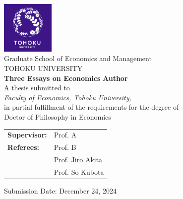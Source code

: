\documentclass[oneside, 12pt, a4paper]{book}
\author{author}
\theoremstyle{definition}\newtheorem{definition}{Definition}
\theoremstyle{theorem}\newtheorem{corollary}{Corollary}
\theoremstyle{definition}\newtheorem{ass}{Assumption}
\theoremstyle{definition}\newtheorem{remark}{Remark}
\theoremstyle{theorem}\newtheorem{prop}{Proposition}
\theoremstyle{theorem}\newtheorem{lemma}{Lemma}
\theoremstyle{definition}\newtheorem{fact}{Fact}
\numberwithin{corollary}{chapter}
\numberwithin{prop}{chapter}
\numberwithin{ass}{chapter}
\numberwithin{definition}{chapter}
\numberwithin{lemma}{chapter}
\numberwithin{equation}{chapter}
\begin{document}

\begin{titlepage}
    \begin{center}
        \includegraphics[width=0.19\textwidth]{logo.png}\\[5pt]
        {Graduate School of Economics and Management}\\[5pt]
        {TOHOKU UNIVERSITY}\\[5pt]
        
        \vspace{1.5cm}
        {\huge\bfseries Three Essays on Economics}
        \vspace{1.5cm}
        {\Large\bfseries Author}\\[5pt]
        
        \vspace{2cm}
        {A thesis  submitted to} \\[5pt]
        \emph{{Faculty of Economics, Tohoku University,}}\\[5pt]
        {in partial fulfillment of the requirements for the degree of } \\[5pt]
        {Doctor of Philosophy in Economics} \\[5pt]
        \vfill
        
        \begin{tabular}{l l} 
            \textbf{Supervisor:}  & Prof. A \\ 
            \textbf{Referees:}    & Prof. B \\
                                  & Prof. Jiro Akita \\
                                  & Prof. So Kubota
        \end{tabular} 
        
        \vfill
        Submission Date: December 24, 2024
    \end{center}
\end{titlepage}
\end{document}

